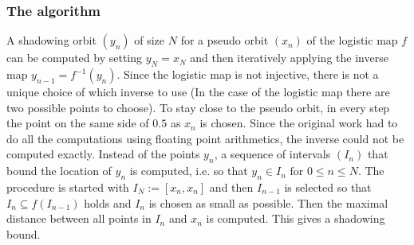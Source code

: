     \subsubsection{The algorithm}
  A shadowing orbit $(y_n)$ of size $N$ for a pseudo orbit $(x_n)$ of the logistic map $f$ can be computed by setting $y_N = x_N$ and then iteratively applying the inverse map $y_{n-1} = f^{-1}(y_n)$. Since the logistic map is not injective, there is not a unique choice of which inverse to use (In the case of the logistic map there are two possible points to choose). 
  To stay close to the pseudo orbit, in every step the point on the same side of $0.5$ as $x_n$ is chosen.   
  Since the original work had to do all the computations using floating point arithmetics, the inverse could not be computed exactly.
  Instead of the points $y_n$, a sequence of intervals $(I_n)$ that bound the location of $y_n$ is computed, i.e. so that $y_n \in I_n \text{ for } 0 \leq n \leq N$.
  The procedure is started with $I_N := [x_n, x_n]$ and then $I_{n-1}$ is selected so that $I_n \subseteq f(I_{n-1})$ holds and $I_n$ is chosen as small as possible. 
  Then the maximal distance between all points in $I_n$ and $x_n$ is computed.
  This gives a shadowing bound.
